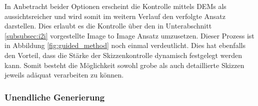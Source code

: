In Anbetracht beider Optionen erscheint die Kontrolle mittels \ac{DEM}s als aussichtsreicher und wird somit im weitern Verlauf den verfolgte Ansatz darstellen. Dies erlaubt es die Kontrolle über den in Unterabschnitt \ref{subsubsec:i2i} vorgestellte Image to Image Ansatz umzusetzen. Dieser Prozess ist in Abbildung \ref{fig:guided_method} noch einmal verdeutlicht. Dies hat ebenfalls den Vorteil, dass die Stärke der Skizzenkontrolle dynamisch festgelegt werden kann. Somit besteht die Möglichkeit sowohl grobe als auch detaillierte Skizzen jeweils adäquat verarbeiten zu können. 

\subsubsection {Unendliche Generierung}

